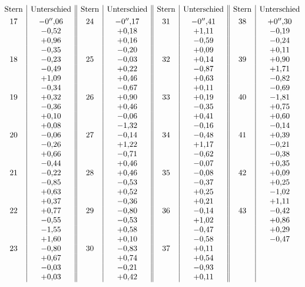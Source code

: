 \par\clearpage
\noindent\makebox[12mm][l]{}\par\medskip

{\small
\[
\begin{array}{@{}c|c||c|c||c|c||c|c@{}}
\text{Stern}&\text{Unterschied}&\text{Stern}&\text{Unterschied}&
\text{Stern}&\text{Unterschied}&\text{Stern}&\text{Unterschied}\\[.8ex]
17&-0''{,}06&24&-0''{,}17&31&-0''{,}41&38&+0''{,}30\\
&-0{,}52&&+0{,}18&&+1{,}11&&-0{,}19\\
&+0{,}96&&+0{,}16&&-0{,}59&&-0{,}24\\
&-0{,}35&&-0{,}20&&+0{,}09&&+0{,}11\\
18&-0{,}23&25&-0{,}03&32&+0{,}14&39&+0{,}90\\
&-0{,}49&&+0{,}22&&-0{,}87&&+1{,}71\\
&+1{,}09&&+0{,}46&&+0{,}63&&-0{,}82\\
&-0{,}34&&-0{,}67&&+0{,}11&&-0{,}69\\
19&+0{,}32&26&+0{,}90&33&+0{,}19&40&-1{,}81\\
&-0{,}36&&+0{,}46&&-0{,}35&&+0{,}75\\
&+0{,}10&&-0{,}06&&+0{,}41&&+0{,}60\\
&+0{,}08&&-1{,}32&&-0{,}16&&-0{,}14\\
20&-0{,}06&27&-0{,}14&34&-0{,}48&41&+0{,}39\\
&-0{,}26&&+1{,}22&&+1{,}17&&-0{,}21\\
&+0{,}66&&-0{,}71&&-0{,}62&&-0{,}38\\
&-0{,}44&&+0{,}46&&-0{,}07&&+0{,}35\\
21&-0{,}22&28&+0{,}46&35&-0{,}08&42&+0{,}09\\
&-0{,}85&&-0{,}53&&-0{,}37&&+0{,}25\\
&+0{,}63&&+0{,}52&&+0{,}25&&-1{,}02\\
&+0{,}37&&-0{,}36&&+0{,}21&&+1{,}11\\
22&+0{,}77&29&-0{,}80&36&-0{,}14&43&-0{,}42\\
&-0{,}55&&-0{,}53&&+1{,}02&&+0{,}86\\
&-1{,}55&&+0{,}58&&-0{,}47&&+0{,}29\\
&+1{,}60&&+0{,}10&&-0{,}58&&-0{,}47\\
23&-0{,}80&30&-0{,}83&37&+0{,}11&&\\
&+0{,}67&&+0{,}74&&+0{,}54&&\\
&-0{,}03&&-0{,}21&&-0{,}93&&\\
&+0{,}03&&+0{,}42&&+0{,}11&&
\end{array}
\]
\par
}

